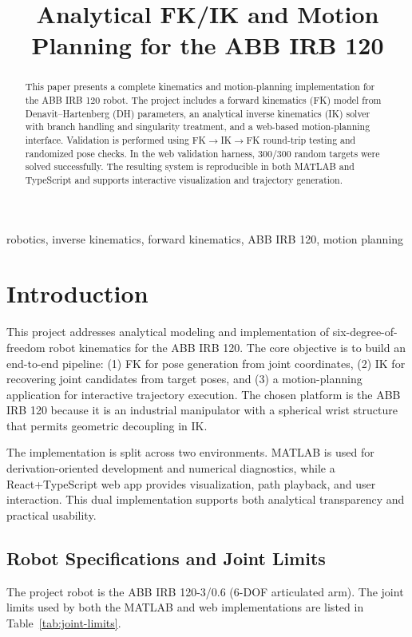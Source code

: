 \documentclass[conference]{IEEEtran}
\title{Analytical FK/IK and Motion Planning for the ABB IRB 120}
\author{\IEEEauthorblockN{Ame Merrifield}
\IEEEauthorblockA{ME 7751 -- Robotics\\
Spring 2026}}
\begin{document}
\maketitle

\begin{abstract}
This paper presents a complete kinematics and motion-planning implementation for the ABB IRB 120 robot. The project includes a forward kinematics (FK) model from Denavit--Hartenberg (DH) parameters, an analytical inverse kinematics (IK) solver with branch handling and singularity treatment, and a web-based motion-planning interface. Validation is performed using FK$\rightarrow$IK$\rightarrow$FK round-trip testing and randomized pose checks. In the web validation harness, 300/300 random targets were solved successfully. The resulting system is reproducible in both MATLAB and TypeScript and supports interactive visualization and trajectory generation.
\end{abstract}

\begin{IEEEkeywords}
robotics, inverse kinematics, forward kinematics, ABB IRB 120, motion planning
\end{IEEEkeywords}

\section{Introduction}
This project addresses analytical modeling and implementation of six-degree-of-freedom robot kinematics for the ABB IRB 120. The core objective is to build an end-to-end pipeline: (1) FK for pose generation from joint coordinates, (2) IK for recovering joint candidates from target poses, and (3) a motion-planning application for interactive trajectory execution. The chosen platform is the ABB IRB 120 because it is an industrial manipulator with a spherical wrist structure that permits geometric decoupling in IK.

The implementation is split across two environments. MATLAB is used for derivation-oriented development and numerical diagnostics, while a React+TypeScript web app provides visualization, path playback, and user interaction. This dual implementation supports both analytical transparency and practical usability.

\subsection{Robot Specifications and Joint Limits}
The project robot is the ABB IRB 120-3/0.6 (6-DOF articulated arm). The joint limits used by both the MATLAB and web implementations are listed in Table~\ref{tab:joint-limits}.
\end{document}
